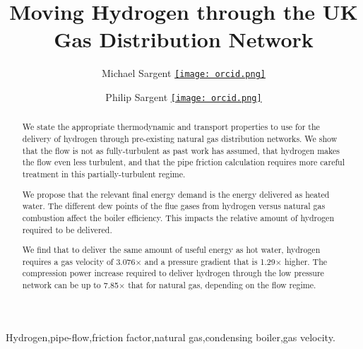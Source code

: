 \documentclass[5p]{elsarticle} %
\newcommand{\orcid}[1]{\href{https://orcid.org/#1}{\texttt{[image: orcid.png]}}}
\begin{document}
\begin{frontmatter}



\title{Moving Hydrogen through the UK Gas Distribution Network}

\author[mjs]{Michael Sargent \orcid{0000-0001-9129-2990} }

\author[mjs]{Philip Sargent \orcid{0000-0002-1825-0097}}

\address[mjs]{Cambridge Energy UK, 27 Greville Road, Cambridge CB1 3QJ, UK }

\begin{abstract}

We state the appropriate thermodynamic and transport properties to use for the delivery of hydrogen through pre-existing natural gas distribution networks. 
We show that the flow is not as fully-turbulent as past work has assumed, that hydrogen makes the flow even less turbulent, and that the pipe friction calculation requires more careful treatment in this partially-turbulent regime.

We propose that the relevant final energy demand is the energy delivered as heated water. 
The different dew points of the flue gases from hydrogen versus natural gas combustion affect the boiler efficiency. This impacts the relative amount of hydrogen required to be delivered.

We find that to deliver the same amount of useful energy as hot water, hydrogen requires a gas velocity of 3.076$\times$ and a pressure gradient that is 1.29$\times$ higher.
The compression power increase required to deliver hydrogen through the low pressure network can be up to 7.85$\times$ that for natural gas, depending on the flow regime.

\end{abstract}

\begin{keyword}
Hydrogen\sep pipe-flow\sep friction factor\sep natural gas\sep condensing boiler\sep gas velocity.
\end{keyword}

\end{frontmatter}
\end{document}
